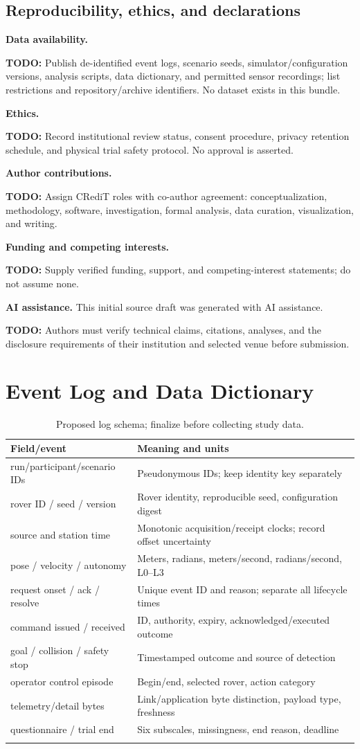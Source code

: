 \documentclass[12pt,oneside]{report}
\newcommand{\todo}[1]{\par\noindent\textcolor{red!65!black}{\textbf{TODO:} #1}\par}
\begin{document}
\section{Reproducibility, ethics, and declarations}
\textbf{Data availability.} \todo{Publish de-identified event logs, scenario seeds, simulator/configuration versions, analysis scripts, data dictionary, and permitted sensor recordings; list restrictions and repository/archive identifiers. No dataset exists in this bundle.}
\textbf{Ethics.} \todo{Record institutional review status, consent procedure, privacy retention schedule, and physical trial safety protocol. No approval is asserted.}
\textbf{Author contributions.} \todo{Assign CRediT roles with co-author agreement: conceptualization, methodology, software, investigation, formal analysis, data curation, visualization, and writing.}
\textbf{Funding and competing interests.} \todo{Supply verified funding, support, and competing-interest statements; do not assume none.}
\textbf{AI assistance.} This initial source draft was generated with AI assistance. \todo{Authors must verify technical claims, citations, analyses, and the disclosure requirements of their institution and selected venue before submission.}

\appendix
\chapter{Event Log and Data Dictionary}
\begin{longtable}{p{.30\linewidth}p{.55\linewidth}}\toprule
Field/event & Meaning and units \\\midrule
run/participant/scenario IDs & Pseudonymous IDs; keep identity key separately \\
rover ID / seed / version & Rover identity, reproducible seed, configuration digest \\
source and station time & Monotonic acquisition/receipt clocks; record offset uncertainty \\
pose / velocity / autonomy & Meters, radians, meters/second, radians/second, L0--L3 \\
request onset / ack / resolve & Unique event ID and reason; separate all lifecycle times \\
command issued / received & ID, authority, expiry, acknowledged/executed outcome \\
goal / collision / safety stop & Timestamped outcome and source of detection \\
operator control episode & Begin/end, selected rover, action category \\
telemetry/detail bytes & Link/application byte distinction, payload type, freshness \\
questionnaire / trial end & Six subscales, missingness, end reason, deadline \\\bottomrule\caption{Proposed log schema; finalize before collecting study data.}\\
\end{longtable}
\end{document}
